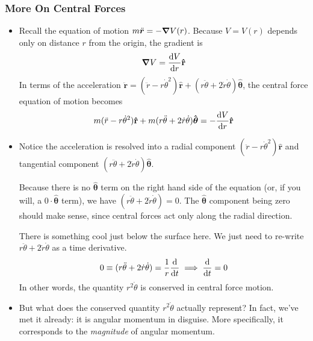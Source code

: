 \documentclass[11pt, a4paper]{article}
\newcommand{\bddot}[1]{\ddot{\bm{#1}}} %
\newcommand{\uvec}[1]{\bm{\hat{\mathbf{#1}}}} %
\begin{document}
\subsubsection{More On Central Forces}
\begin{itemize}
	\item Recall the equation of motion $ m \bddot{r} = - \grad{V}(r) $. Because $ V = V(r)$ depends only on distance $ r $ from the origin, the gradient is
	\begin{equation*}
		\grad{V} = \dv{V}{r} \uvec{r}
	\end{equation*}
	In terms of the acceleration $ \bddot{r} = (\ddot{r} - r\dot{\theta}^{2}) \uvec{r} + (r \ddot{\theta} + 2 \dot{r} \dot{\theta}) \uvec{\theta} $, the central force equation of motion becomes
	\begin{equation*}
		m(\ddot{r} - r\dot{\theta}^{2}) \uvec{r} + m(r \ddot{\theta} + 2 \dot{r} \dot{\theta}) \uvec{\theta} = - \dv{V}{r} \uvec{r}
	\end{equation*}
	
	\item Notice the acceleration is resolved into a radial component $ (\ddot{r} - r\dot{\theta}^{2}) \uvec{r} $ and tangential  component $ (r \ddot{\theta} + 2 \dot{r} \dot{\theta}) \uvec{\theta} $. 
	
	Because there is no $ \uvec{\theta} $ term on the right hand side of the equation (or, if you will, a $ 0 \cdot \uvec{\theta} $ term), we have $ (r \ddot{\theta} + 2 \dot{r} \dot{\theta}) = 0 $. The $ \uvec{\theta} $ component being zero should make sense, since central forces act only along the radial direction.
	
	There is something cool just below the surface here. We just need to re-write $ r \ddot{\theta} + 2 \dot{r} \dot{\theta} $ as a time derivative.
	\begin{equation*}
		0 \equiv (r \ddot{\theta} + 2 \dot{r} \dot{\theta}) = \frac{1}{r} \dv{}{t} (r^{2} \dot{\theta}) \implies \dv{}{t} (r^{2} \dot{\theta}) = 0
	\end{equation*}
	In other words, the quantity $ r^{2} \dot{\theta} $ is conserved in central force motion.
	
	\item But what does the conserved quantity $ r^{2} \dot{\theta} $ actually represent? In fact, we've met it already: it is angular momentum in disguise. More specifically, it corresponds to the \textit{magnitude} of angular momentum. 
	

\end{itemize}
\end{document}
